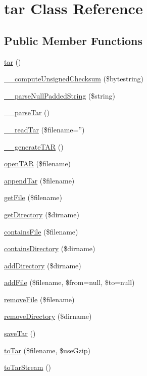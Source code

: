 \hypertarget{classtar}{\section{tar Class Reference}
\label{classtar}
}
\subsection*{Public Member Functions}
\begin{DoxyCompactItemize}
\item 
\hyperlink{classtar_a310c3cc3417ea0fdb5c1c96cc5b47efa}{tar} ()
\item 
\hyperlink{classtar_a2f9a99c49a3ab86475a1cd26e722c0fa}{\-\_\-\-\_\-compute\-Unsigned\-Checksum} (\$bytestring)
\item 
\hyperlink{classtar_ab9d60205cd0862d6d3cfb582b43a3288}{\-\_\-\-\_\-parse\-Null\-Padded\-String} (\$string)
\item 
\hyperlink{classtar_a8d8793668fa7e2de0beb4dca399ee3ed}{\-\_\-\-\_\-parse\-Tar} ()
\item 
\hyperlink{classtar_a1422972f8f5afac82f82ecab505b4079}{\-\_\-\-\_\-read\-Tar} (\$filename='')
\item 
\hyperlink{classtar_a97fd04b02c85bbb3eb588a160237f375}{\-\_\-\-\_\-generate\-T\-A\-R} ()
\item 
\hyperlink{classtar_a62fc429d1e33de90d1ce65c3c16a4193}{open\-T\-A\-R} (\$filename)
\item 
\hyperlink{classtar_a3c35ee6b05a860a0108afa5853db4070}{append\-Tar} (\$filename)
\item 
\hyperlink{classtar_a8eb93e97f657daf1a3671c60f7093745}{get\-File} (\$filename)
\item 
\hyperlink{classtar_a02157ed6604bec5f931ad08d1c5c048f}{get\-Directory} (\$dirname)
\item 
\hyperlink{classtar_ac7ba975f7bcf57d9a8167feb7122933e}{contains\-File} (\$filename)
\item 
\hyperlink{classtar_aff90f763b61b935c856eb7e634a2c0a7}{contains\-Directory} (\$dirname)
\item 
\hyperlink{classtar_a046188f5c3141d52246774c13ab2c895}{add\-Directory} (\$dirname)
\item 
\hyperlink{classtar_a374a307255a5fc5110749b1e37946947}{add\-File} (\$filename, \$from=null, \$to=null)
\item 
\hyperlink{classtar_a51cd4b11f9e4e6c9c5c0bc93d5a063c7}{remove\-File} (\$filename)
\item 
\hyperlink{classtar_a17971edb42a8be66b554ca5d6cf6bc1e}{remove\-Directory} (\$dirname)
\item 
\hyperlink{classtar_ac70edc9fc85a3106aaa3c07a3a57a0a2}{save\-Tar} ()
\item 
\hyperlink{classtar_acfe90e92d12e463da735e3c42e5a74f1}{to\-Tar} (\$filename, \$use\-Gzip)
\item 
\hyperlink{classtar_a347041e79cbe8f150933afe77f35826f}{to\-Tar\-Stream} ()
\end{DoxyCompactItemize}
